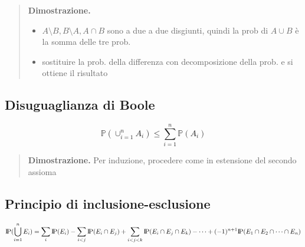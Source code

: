 \documentclass[a4paper,10pt]{article}
\newcommand{\pr}{\text{I\kern-0.15em P}} %
\theoremstyle{remark}
\theoremstyle{definition}
\newenvironment{dimo}{\begin{quote}\textbf{Dimostrazione.}}{\end{quote}} %
\begin{document}
\begin{dimo}
    \begin{itemize}
        \item $A\setminus B, B\setminus A,A\cap B$ sono a due a due disgiunti, quindi la prob di $A\cup B$ è la somma delle tre prob.
        \item sostituire la prob. della differenza con decomposizione della prob. e si ottiene il risultato
    \end{itemize}
\end{dimo}

\subsection{Disuguaglianza di Boole}
$$\mathbb{P}(\cup_{i=1}^n A_i)\le\sum_{i=1}^n \mathbb{P}(A_i)$$
\begin{dimo}
    Per induzione, procedere come in estensione del secondo assioma
\end{dimo}

\subsection{Principio di inclusione-esclusione}
  \[\pr (\bigcup_{i=1}^n E_i) = \sum_i \pr(E_i)-\sum_{i<j}\pr(E_i\cap E_j)+\sum_{i<j<k}\pr(E_i\cap E_j \cap E_k)-\dotsm+(-1)^{n+1}\pr (E_1\cap E_2 \cap \dotsm \cap E_n)\]
\end{document}

